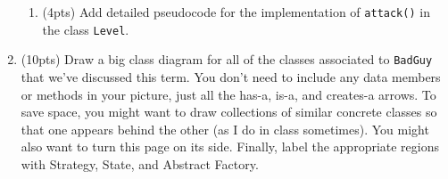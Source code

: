 \documentclass[11pt]{article}
\begin{document}
\begin{enumerate}
\begin{enumerate}
  \item (4pts) Add detailed pseudocode for the implementation of \texttt{attack()} in the class \texttt{Level}. 

  \end{enumerate}

\newpage

  \item (10pts) Draw a big class diagram for all of the classes associated to \texttt{BadGuy} that we've discussed this term. You don't need to include any data members or methods in your picture, just all the has-a, is-a, and creates-a arrows. To save space, you might want to draw collections of similar concrete classes so that one appears behind the other (as I do in class sometimes). You might also want to turn this page on its side. Finally, label the appropriate regions with Strategy, State, and Abstract Factory. 

\end{enumerate}
\end{document}
